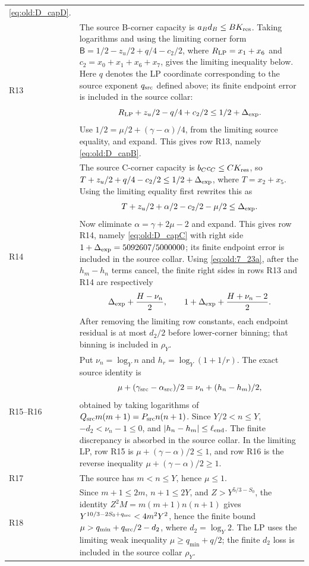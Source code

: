 \begin{longtable}{@{}p{}p{}@{}}
\eqref{eq:old:D_capD}. \\
R13 & The source B-corner capacity is \(a_Bd_B\le B K_{\rm res}\).
Taking logarithms and using the limiting corner form
\(\mathsf B=1/2-z_u/2+q/4-c_2/2\), where
\(R_{\rm LP}=x_1+x_6\) and \(c_2=x_0+x_1+x_6+x_7\), gives
the limiting inequality below. Here \(q\) denotes the LP coordinate
corresponding to the source exponent \(q_{\rm src}\) defined above; its
finite endpoint error is included in the source collar:
\[
R_{\rm LP}+z_u/2-q/4+c_2/2\le1/2+\Delta_{\rm exp}.
\]
Use \(1/2=\mu/2+(\gamma-\alpha)/4\), from the
limiting source equality, and expand. This gives row R13, namely
\eqref{eq:old:D_capB}. \\
R14 & The source C-corner capacity is \(b_Cc_C\le C K_{\rm res}\), so
\(T+z_u/2+q/4-c_2/2\le1/2+\Delta_{\rm exp}\), where
\(T=x_2+x_5\). Using the limiting equality first rewrites this as
\[
T+z_u/2+\alpha/2-c_2/2-\mu/2\le\Delta_{\rm exp}.
\]
Now eliminate \(\alpha=\gamma+2\mu-2\) and expand.
This gives row R14, namely \eqref{eq:old:D_capC} with right side
\(1+\Delta_{\rm exp}=5092607/5000000\); its finite endpoint error is
included in the source collar. Using \eqref{eq:old:7_23a}, after the
\(h_m-h_n\) terms cancel, the finite right sides in rows R13 and R14
are respectively
\[
 \Delta_{\rm exp}+\frac{H-\nu_n}{2},\qquad
 1+\Delta_{\rm exp}+\frac{H+\nu_n-2}{2}.
\]
After removing the limiting row constants, each endpoint residual is at
most \(d_2/2\) before lower-corner binning; that binning is included in
\(\rho_Y\). \\
R15--R16 & Put \(\nu_n=\log_Yn\) and
\(h_r=\log_Y(1+1/r)\). The exact source identity is
\[
\mu+(\gamma_{\rm src}-\alpha_{\rm src})/2
=\nu_n+(h_n-h_m)/2,
\]
obtained by taking logarithms of
\(Q_{\rm src}m(m+1)=P_{\rm src}n(n+1)\). Since \(Y/2<n\le Y\),
\(-d_2<\nu_n-1\le0\), and \(|h_n-h_m|\le\ell_{\rm end}\).
The finite discrepancy is absorbed in the source collar. In the limiting
LP, row R15 is
\(\mu+(\gamma-\alpha)/2\le1\), and row R16 is
the reverse inequality
\(\mu+(\gamma-\alpha)/2\ge1\). \\
R17 & The source has \(m<n\le Y\), hence \(\mu\le1\). \\
R18 & Since \(m+1\le2m\), \(n+1\le2Y\), and
\(Z>Y^{5/3-S_0}\), the identity
\(Z^2M=m(m+1)n(n+1)\) gives
\(Y^{10/3-2S_0+q_{\rm src}}<4m^2Y^2\), hence the finite bound
\(\mu>q_{\min}+q_{\rm src}/2-d_2\), where \(d_2=\log_Y2\). The LP uses the
limiting weak inequality \(\mu\ge q_{\min}+q/2\); the finite \(d_2\)
loss is included in the source collar \(\rho_Y\). \\

\end{longtable}
